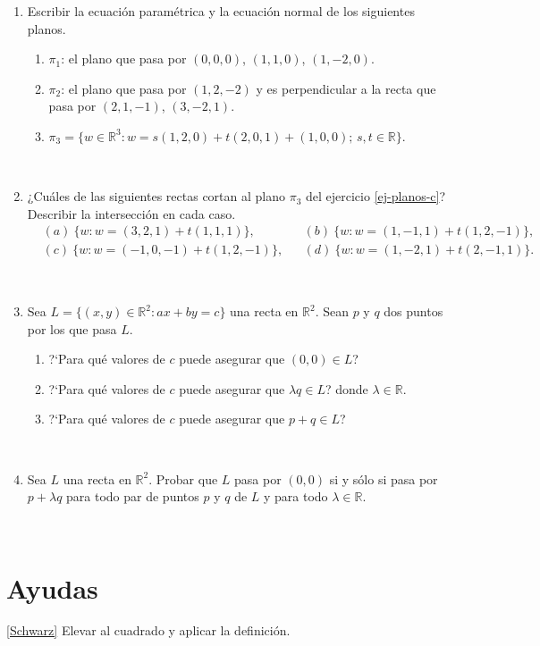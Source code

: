 \documentclass[a4paper,12pt,twoside,spanish,reqno]{amsbook}
\numberwithin{equation}{section}
\begin{document}
\begin{enumerate}[resume]
\


\item\label{ej-planos} Escribir la ecuaci{\'o}n param\'etrica  y la ecuaci{\'o}n normal de los siguientes planos.
\begin{enumerate}
	\item $\pi_1$: el plano que pasa por $(0,0,0)$, $(1,1,0)$, $(1,-2,0)$.
	\item $\pi_2$: el plano que pasa por $(1,2,-2)$ y es perpendicular a la
	recta que pasa por $(2,1,-1)$, $(3,-2,1)$.
	\item\label{ej-planos-c}  $\pi_3=\{w\in\mathbb{R}^3: w=s(1,2,0)+t(2,0,1)+(1,0,0);\,s,t\in \mathbb R\}$.
\end{enumerate}

\


\item ¿Cu\'ales de las siguientes rectas cortan al plano $\pi_3$ del  ejercicio \eqref{ej-planos-c}?
Describir la intersecci{\'o}n en cada caso.
\begin{align*}
&(a) \ \{w: w=(3,2,1)+t(1,1,1)\}, && (b) \  \{w: w=(1,-1,1)+t(1,2,-1)\}, \\
&(c)\  \{w: w=(-1,0,-1)+t(1,2,-1)\}, && (d) \  \{w: w=(1,-2,1)+t(2,-1,1)\}.
\end{align*}

\

\item\label{rectas como subespacio} Sea $L=\{(x,y)\in\mathbb{R}^2 : ax+by=c\}$ una recta en $\mathbb{R}^2$. Sean $p$ y $q$ dos puntos por los que pasa $L$.
\begin{enumerate}
 \item ?`Para qu\'e valores de $c$ puede asegurar que $(0,0)\in L$?
 \item ?`Para qu\'e valores de $c$ puede asegurar que $\lambda q\in L$? donde $\lambda\in\mathbb{R}$.
 \item ?`Para qu\'e valores de $c$ puede asegurar que $p+q\in L$?
\end{enumerate}


\

\item Sea $L$ una recta en $\mathbb{R}^2$. Probar que $L$ pasa por $(0,0)$ si y s\'olo si pasa por $p+\lambda q$ para todo par de puntos $p$ y $q$ de $L$ y para todo $\lambda\in\mathbb{R}$.
\end{enumerate}

\

\section*{Ayudas}
\eqref{Schwarz} Elevar al cuadrado y aplicar la definici\'on.
\end{document}
